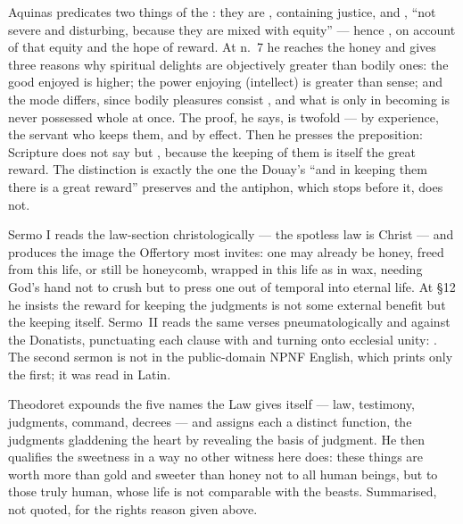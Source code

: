 \begin{witnessnote}
Aquinas predicates two things of the : they are ,
containing justice, and , ``not severe and disturbing, because
they are mixed with equity'' --- hence , on account
of that equity and the hope of reward. At n.~7 he reaches the honey and gives
three reasons why spiritual delights are objectively greater than bodily ones:
the good enjoyed is higher; the power enjoying (intellect) is greater than
sense; and the mode differs, since bodily pleasures consist , and what is only in becoming is never possessed whole at once. The
proof, he says, is twofold --- by experience, the servant who keeps them, and
by effect. Then he presses the preposition: Scripture does not say  but , because the keeping of them is
itself the great reward. The distinction is exactly the one the Douay's ``and
in keeping them there is a great reward'' preserves and the antiphon, which
stops before it, does not.
\end{witnessnote}

\begin{witnessnote}
Sermo I reads the law-section christologically --- the spotless law is Christ
--- and produces the image the Offertory most invites: one may already be
honey, freed from this life, or still be honeycomb, wrapped in this life as in
wax, needing God's hand not to crush but to press one out of temporal into
eternal life. At §12 he insists the reward for keeping the judgments is not
some external benefit but the keeping itself. Sermo~II reads the same verses
pneumatologically and against the Donatists, punctuating each clause with
 and turning 
onto ecclesial unity: . The second sermon is not in the public-domain NPNF English, which prints only the first; it was read in Latin.
\end{witnessnote}

\begin{witnessnote}
Theodoret expounds the five names the Law gives itself --- law, testimony,
judgments, command, decrees --- and assigns each a distinct function, the
judgments gladdening the heart by revealing the basis of judgment. He then
qualifies the sweetness in a way no other witness here does: these things are
worth more than gold and sweeter than honey not to all human beings, but to
those truly human, whose life is not comparable with the beasts. Summarised,
not quoted, for the rights reason given above.
\end{witnessnote}

